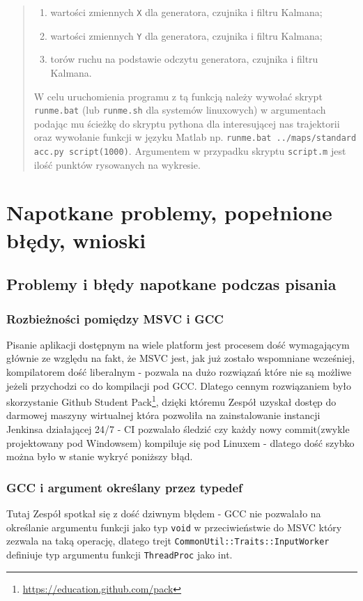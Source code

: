 \documentclass{article}
\begin{document}
\begin{enumerate}
\begin{verse}
		\begin{enumerate}
			\item wartości zmiennych \texttt{X} dla generatora, czujnika i filtru Kalmana;
			\item wartości zmiennych \texttt{Y} dla generatora, czujnika i filtru Kalmana;
			\item torów ruchu na podstawie odczytu generatora, czujnika i filtru Kalmana.
		\end{enumerate}
		W celu uruchomienia programu z tą funkcją należy wywołać skrypt \texttt{runme.bat} (lub \texttt{runme.sh} dla systemów linuxowych) w argumentach podając mu ścieżkę do skryptu pythona dla interesującej nas trajektorii oraz wywołanie funkcji w języku Matlab np. \texttt{runme.bat ../maps/standard acc.py script(1000)}. Argumentem w przypadku skryptu \texttt{script.m} jest ilość punktów rysowanych na wykresie.
		\end{verse}
	\end{enumerate}
	
	\section{Napotkane problemy, popełnione błędy, wnioski}
	
	\subsection{Problemy i błędy napotkane podczas pisania}
	\subsubsection{Rozbieżności pomiędzy MSVC i GCC}
	Pisanie aplikacji dostępnym na wiele platform jest procesem dość wymagającym głównie ze względu na fakt, że MSVC jest, jak już zostało wspomniane wcześniej, kompilatorem dość liberalnym - pozwala na dużo rozwiązań które nie są możliwe jeżeli przychodzi co do kompilacji pod GCC. Dlatego cennym rozwiązaniem było skorzystanie Github Student Pack\footnote{\url{https://education.github.com/pack}}, dzięki któremu Zespół uzyskał dostęp do darmowej maszyny wirtualnej która pozwoliła na zainstalowanie instancji Jenkinsa działającej 24/7 - CI pozwalało śledzić czy każdy nowy commit(zwykle projektowany pod Windowsem) kompiluje się pod Linuxem - dlatego dość szybko można było w stanie wykryć poniższy błąd.
	\subsubsection{GCC i argument określany przez typedef}
	Tutaj Zespół spotkał się z dość dziwnym błędem - GCC nie pozwalało na określanie argumentu funkcji jako typ \texttt{void} w przeciwieństwie do MSVC  który zezwala na taką operację, dlatego trejt \texttt{CommonUtil::Traits::InputWorker} definiuje typ argumentu funkcji \texttt{ThreadProc} jako int.
\end{document}
